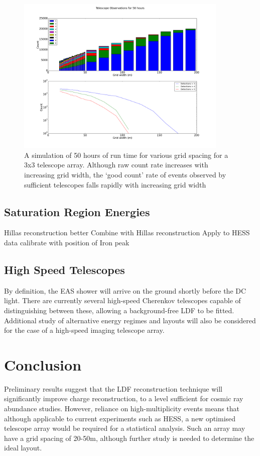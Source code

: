 \documentclass[11pt]{article}
\begin{document}
\begin{figure}
\begin{center}
\includegraphics[width=0.9\textwidth]{optimiselayout}
\caption{A simulation of 50 hours of run time for various grid spacing for a 3x3 telescope array. Although raw count rate increases with increasing grid width, the \textquoteleft good count' rate of events observed by sufficient telescopes falls rapidly with increasing grid width}
\label{fig:optmiselayout}
\end{center}
\end{figure}

\subsection{Saturation Region Energies}
Hillas reconstruction better
Combine with Hillas reconstruction
Apply to HESS data
calibrate with position of Iron peak


\subsection{High Speed Telescopes}
By definition, the EAS shower will arrive on the ground shortly before the DC light. There are currently several high-speed Cherenkov telescopes capable of distinguishing between these, allowing a background-free LDF to be fitted. Additional study of alternative energy regimes and layouts will also be considered for the case of a high-speed imaging telescope array. 

\section{Conclusion}
Preliminary results suggest that the LDF reconstruction technique will significantly improve charge reconstruction, to a level sufficient for cosmic ray abundance studies. However, reliance on high-multiplicity events means that although applicable to current experiments such as HESS, a new optimised telescope array would be required for a statistical analysis. Such an array may have a grid spacing of 20-50m, although further study is needed to determine the ideal layout.
\end{document}
